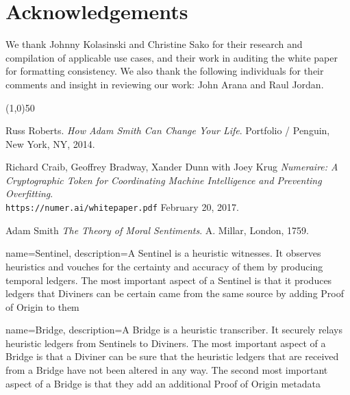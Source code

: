 \documentclass{article}
\begin{document}
\section {Acknowledgements}

We thank Johnny Kolasinski and Christine Sako for their research and compilation of applicable use cases, and their work in auditing the white paper for formatting consistency. We also thank the following individuals for their comments and insight in reviewing our work: John Arana and Raul Jordan.

\begin{center}
\line(1,0){50}
\end{center}





\begin{thebibliography}{9}
Russ Roberts. 
\textit{How Adam Smith Can Change Your Life}. 
Portfolio / Penguin, New York, NY, 2014.
 
Richard Craib, Geoffrey Bradway, Xander Dunn with Joey Krug
\textit{Numeraire: A Cryptographic Token for Coordinating Machine Intelligence and Preventing Overfitting}.
\\\texttt{https://numer.ai/whitepaper.pdf}
February 20, 2017.
 
Adam Smith
\textit{The Theory of Moral Sentiments}. 
A. Millar, London, 1759.


\end{thebibliography}


\clearpage



{
    name={Sentinel},
    description={A Sentinel is a heuristic witnesses. It observes heuristics and vouches for the certainty and accuracy of them by producing temporal ledgers. The most important aspect of a Sentinel is that it produces ledgers that Diviners can be certain came from the same source by adding Proof of Origin to them}
}



{
    name={Bridge},
    description={A Bridge is a heuristic transcriber. It securely relays heuristic ledgers from Sentinels to Diviners. The most important aspect of a Bridge is that a Diviner can be sure that the heuristic ledgers that are received from a Bridge have not been altered in any way. The second most important aspect of a Bridge is that they add an additional Proof of Origin metadata}
}
\end{document}
